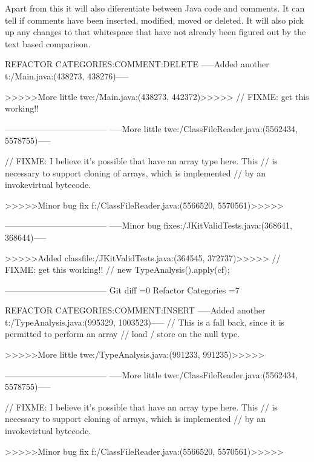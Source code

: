 Apart from this it will also diferentiate between Java code and comments.  It can tell if comments have been inserted, modified, moved or deleted.  It will also pick up any changes to that whitespace that have not already been figured out by the text based comparison.  

 
% 


REFACTOR CATEGORIES:COMMENT:DELETE
-----Added another t:/Main.java:(438273, 438276)-----
				
>>>>>More little twe:/Main.java:(438273, 442372)>>>>>
				// FIXME: get this working!!
				
------------------------------------
-----More little twe:/ClassFileReader.java:(5562434, 5578755)-----
 
			// FIXME: I believe it's possible that have an array type here. This
			// is necessary to support cloning of arrays, which is implemented
			// by an invokevirtual bytecode.
			
>>>>>Minor bug fix f:/ClassFileReader.java:(5566520, 5570561)>>>>>

	
------------------------------------
-----Minor bug fixes:/JKitValidTests.java:(368641, 368644)-----
				
>>>>>Added classfile:/JKitValidTests.java:(364545, 372737)>>>>>
				// FIXME: get this working!!
				// new TypeAnalysis().apply(cf);
	
------------------------------------
Git diff =0  Refactor Categories =7

REFACTOR CATEGORIES:COMMENT:INSERT
-----Added another t:/TypeAnalysis.java:(995329, 1003523)-----
			// This is a fall back, since it is permitted to perform an array
			// load / store on the null type.
			
>>>>>More little twe:/TypeAnalysis.java:(991233, 991235)>>>>>
			
------------------------------------
-----More little twe:/ClassFileReader.java:(5562434, 5578755)-----
 
			// FIXME: I believe it's possible that have an array type here. This
			// is necessary to support cloning of arrays, which is implemented
			// by an invokevirtual bytecode.
			
>>>>>Minor bug fix f:/ClassFileReader.java:(5566520, 5570561)>>>>>

